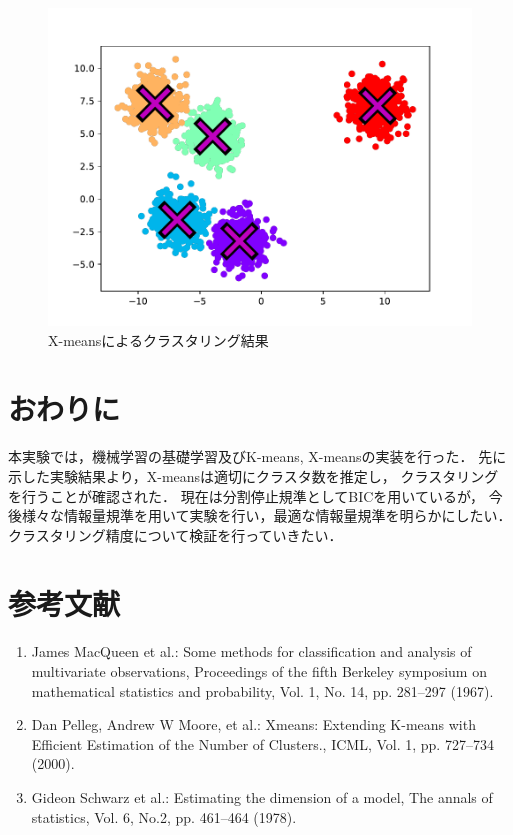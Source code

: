 \documentclass[10pt,a4j]{ltjsarticle}
\begin{document}
\begin{figure}[htbp]
  \begin{center}
    \includegraphics[width=0.8\linewidth]{img/x-means/after.pdf}
    \caption{X-meansによるクラスタリング結果}
    \label{img:xmeans-after}
  \end{center}
\end{figure}

\section{おわりに}
本実験では，機械学習の基礎学習及びK-means, X-meansの実装を行った．
先に示した実験結果より，X-meansは適切にクラスタ数を推定し，
クラスタリングを行うことが確認された．
現在は分割停止規準としてBICを用いているが，
今後様々な情報量規準を用いて実験を行い，最適な情報量規準を明らかにしたい．
クラスタリング精度について検証を行っていきたい．

\section*{参考文献}
\begin{enumerate}
\renewcommand{\labelenumi}{\arabic{enumi})}
  \item James MacQueen et al.:
    Some methods for classification and analysis of multivariate observations,
    Proceedings of the fifth Berkeley symposium on mathematical statistics and probability,
    Vol. 1, No. 14, pp. 281--297 (1967).
  \item Dan Pelleg, Andrew W Moore, et al.:
    Xmeans: Extending K-means with Efficient Estimation of the Number of Clusters.,
    ICML, Vol. 1, pp. 727--734 (2000).
  \item Gideon Schwarz et al.:
    Estimating the dimension of a model,
    The annals of statistics, Vol. 6, No.2, pp. 461--464 (1978).
\end{enumerate}
\end{document}
